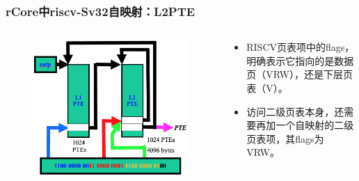 \begin{frame}
    \frametitle{rCore中riscv-Sv32自映射：L2PTE}

    \begin{columns}
    \begin{column}{0.6\textwidth}
        \begin{figure}
        \includegraphics[width=0.85\linewidth]{lecture07/figs/RV-L2-self-mapping.png}
        \end{figure}
    \end{column} \pause
    \begin{column}{0.4\textwidth}
        \begin{itemize}
            \item RISCV页表项中的flags，明确表示它指向的是数据页（VRW），还是下层页表（V）。
            \item 访问二级页表本身，还需要再加一个自映射的二级页表项，其flags为VRW。
        \end{itemize}
    \end{column}
    \end{columns}

\end{frame}

